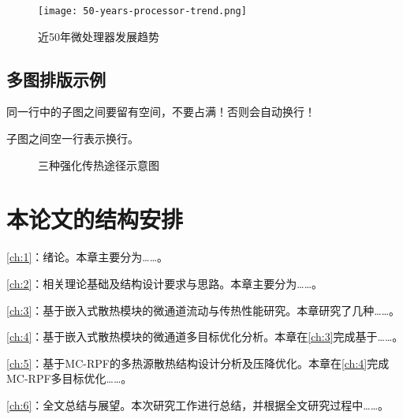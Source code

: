 \begin{figure}[htb]
    \texttt{[image: 50-years-processor-trend.png]}
    \caption[处理器发展]{近50年微处理器发展趋势} %
    \label{fig:processor-trend}
\end{figure}

\subsection{多图排版示例}
同一行中的子图之间要留有空间，不要占满！否则会自动换行！

子图之间空一行表示换行。

\begin{figure}[htb]

    \caption{三种强化传热途径示意图}
    \label{fig:Three-enhanced-heat-transfer-paths}
\end{figure}


\section{本论文的结构安排}
\cref{ch:1}：绪论。本章主要分为……。

\cref{ch:2}：相关理论基础及结构设计要求与思路。本章主要分为……。

\cref{ch:3}：基于嵌入式散热模块的微通道流动与传热性能研究。本章研究了几种……。

\cref{ch:4}：基于嵌入式散热模块的微通道多目标优化分析。本章在\cref{ch:3}完成基于……。

\cref{ch:5}：基于MC-RPF的多热源散热结构设计分析及压降优化。本章在\cref{ch:4}完成MC-RPF多目标优化……。

\cref{ch:6}：全文总结与展望。本次研究工作进行总结，并根据全文研究过程中……。


